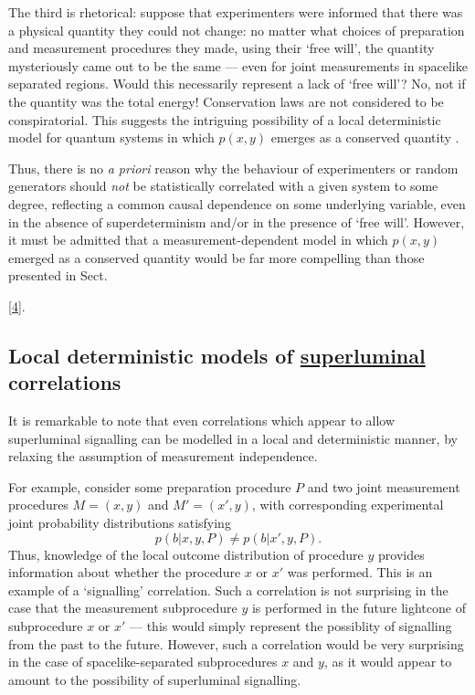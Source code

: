 \documentclass[graybox]{svmult}
\begin{document}
The third is rhetorical: suppose that experimenters were informed that there was a physical quantity they could not change: no matter what choices of preparation and measurement procedures they made, using their `free will', the quantity mysteriously came out to be the same --- even for joint measurements in spacelike separated regions.  Would this necessarily represent a lack of `free will'? No, not if the quantity was the total energy! Conservation laws are not considered to be conspiratorial.  This suggests the intriguing possibility  of a local deterministic model for quantum systems in which $p(x,y)$ emerges as a conserved quantity \cite{dilorenzo}.

Thus, there is no {\it a priori} reason why the behaviour of experimenters or random generators should {\it not} be statistically correlated with a given system to some degree, reflecting a common causal dependence on some underlying variable, even in the absence of superdeterminism and/or in the presence of `free will'.  However, it must be admitted that a measurement-dependent model in which $p(x,y)$ emerged as a conserved quantity would be far more compelling than those presented in Sect.~{\ref{4}.


\subsection{Local deterministic models of \underline{ superluminal} correlations}
\label{5.3}

It is remarkable to note that even correlations which appear to allow superluminal signalling can be modelled in a local and deterministic manner, by relaxing the assumption of measurement independence.

For example, consider some preparation procedure $P$ and two joint measurement procedures $M=(x,y)$ and $M'=(x',y)$, with corresponding experimental joint probability distributions satisfying
\begin{equation} \label{sig} 
p(b|x,y,P) \neq p(b|x',y,P) .
\end{equation}
Thus, knowledge of the local outcome distribution of procedure $y$ provides information about whether the procedure $x$ or $x'$ was performed.  This is an example of  a `signalling' correlation. Such a correlation is not surprising  in the case that the measurement subprocedure $y$ is performed in the future lightcone of subprocedure $x$ or $x'$ --- this would simply represent the possiblity of signalling from the past to the future.  However, such a correlation would be very surprising in the case of spacelike-separated subprocedures $x$ and $y$, as it would appear to amount to the possibility of superluminal signalling.

}
\end{document}
